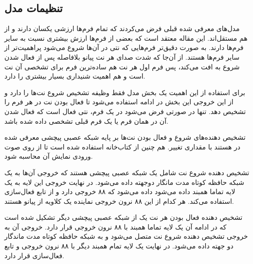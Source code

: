 \subsection{تنظیمات مدل}
مدل‌های معرفی شده قبلی فرض می‌کردند که تمام فرم‌ها ارزشی یکسان دارند و از هم
مستقل‌اند. این مقاله معتقد است که بعضی از فرم‌ها ارزش بیشتری نسبت به سایر فرم‌ها
دارند. به صورت دقیق‌تر فرم‌هایی که نتی در آن‌ها شروع می‌شود پراهمیت‌تر از سایر فرم‌ها
هستند. از آن‌جا که شدت صدای هر نت پیانو بلافاصله پس از فعال شدن شروع به افت می‌کند،
پس فرم اول هر نت هم ساده‌ترین فرم برای تشخصی آن نت است و هم اهمیت شنیداری بسیار
بیشتری را دارد.

برای استفاده از این اهمیت یک بخش مدل فقط وظیفه تشخیص شروع نت‌ها را دارد و از این
خروجی این بخش در ادامه استفاده می‌شود تا فعال بودن نت در هر فرم را تشخیص دهد.
تنها در صورتی فرض می‌شود در یک فرم، نتی فعال است که فعال شدن آن در همان فرم یا
یک فرم قبلی تشخصی داده شده باشد.

تشخیص دهنده‌های شروع و فعال بودن نت‌ها بر پایه شبکه عصبی پیچشی معرفی شده در
\cite{kelz2016potential}
هستند با مقداری تغییر. هم چنین از کتاب‌خانه
 \cite{mcfee2015librosa}
استفاده شده است تا از روی صوت ورودی نمایش
آن محاسبه شود.

تشخیص دهنده شروع نت شامل یک شبکه عصبی پیچشی هستند که
خروجی آن‌ها به یک شبکه حافظه کوتاه مدت مانگار دوجهته داده می‌شود. در نهایت خروجی
این لایه به یک لایه تماما همبند داده می‌شود داده می‌شود که ۸۸ خروجی دارد و از تابع
فعال‌سازی
استفاده می‌کند. هر کدام از این ۸۸ نرون خروجی نماینده یک کلاویه از پیانو هستند.

تشخیص دهنده فعال بودن هر نت یک از شبکه عصبی پیچشی دیگر تشکیل شده است که در
ادامه آن یک لایه تماما همبند با ۸۸ نرون خروجی قرار دارد. خروجی آن به خروجی
تشخیص دهنده شروع نت متصل می‌شود و به شبکه حافظه کوتاه مدت ماندگار دو جهته داده
می‌شود. در نهایت یک لایه تمام همبند دیگر با ۸۸ نرون خروجی و تابع فعال‌سازی
قرار دارد.

